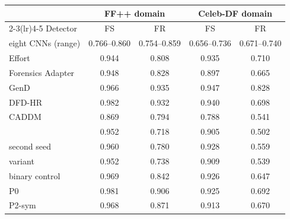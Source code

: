 \begin{tabular}{@{}l cc cc@{}}
\toprule
 & \multicolumn{2}{c}{FF++ domain} & \multicolumn{2}{c}{Celeb-DF domain} \\
\cmidrule(lr){2-3}\cmidrule(lr){4-5}
Detector & FS & FR & FS & FR \\
\midrule
eight CNNs (range) & 0.766--0.860 & 0.754--0.859 & 0.656--0.736 & 0.671--0.740 \\
Effort~\cite{effort} & 0.944 & 0.808 & 0.935 & 0.710 \\
Forensics Adapter~\cite{forensicsadapter} & 0.948 & 0.828 & 0.897 & 0.665 \\
GenD~\cite{gend2026} & 0.966 & 0.935 & 0.947 & 0.828 \\
DFD-HR~\cite{dfdhr2026} & 0.982 & 0.932 & 0.940 & 0.698 \\
CADDM~\cite{caddm} & 0.869 & 0.794 & 0.788 & 0.541 \\
\midrule
\ours{} & 0.952 & 0.718 & 0.905 & 0.502 \\
\quad second seed & 0.960 & 0.780 & 0.928 & 0.559 \\
\quad \ours{} variant & 0.952 & 0.738 & 0.909 & 0.539 \\
binary control & 0.969 & 0.842 & 0.926 & 0.647 \\
P0 & 0.981 & 0.906 & 0.925 & 0.692 \\
P2-sym & 0.968 & 0.871 & 0.913 & 0.670 \\
\bottomrule
\end{tabular}
